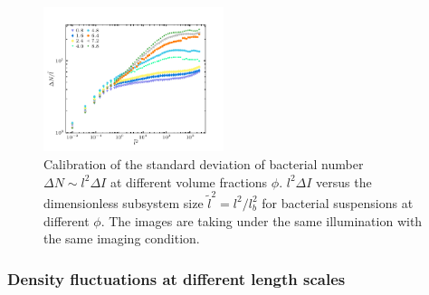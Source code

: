 \documentclass[twocolumn,aps,prx,amsmath,amssymb,longbibliography,superscriptaddress]{revtex4-2}
\begin{document}
\begin{figure}[t]
	\begin{center}
		\includegraphics[width=0.47\textwidth]{Figures/fig-8.pdf}
		\caption[Density autocorrelation]
		{Calibration of the standard deviation of bacterial number $\Delta N \sim l^2\Delta I$ at different volume fractions $\phi$. $l^2\Delta I$ versus the dimensionless subsystem size $\tilde{l}^2 = l^2/l_b^2$ for bacterial suspensions at different $\phi$. The images are taking under the same illumination with the same imaging condition.
		}
		\label{fig:same-conditions}
	\end{center}
\end{figure}

\subsubsection{Density fluctuations at different length scales}
\end{document}
